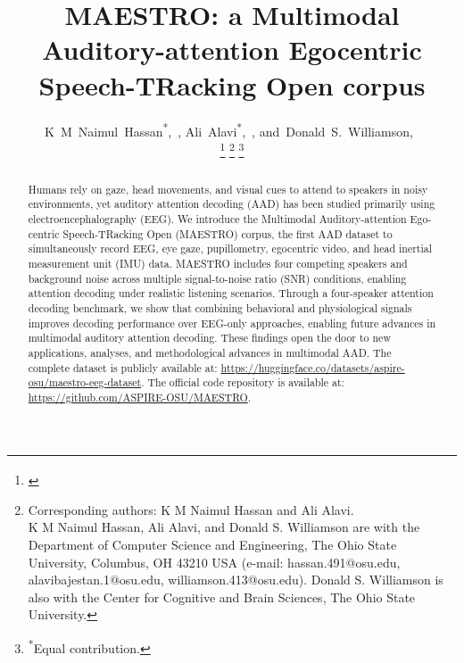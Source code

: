 \documentclass[journal]{IEEEtran}
\begin{document}
\title{MAESTRO: a Multimodal Auditory-attention Egocentric Speech-TRacking Open corpus}

\author{K~M~Naimul~Hassan\textsuperscript{*},~,
        Ali~Alavi\textsuperscript{*},~,
        and~Donald~S.~Williamson,~\\
\thanks{\textsuperscript{}}%
\thanks{Corresponding authors: K M Naimul Hassan and Ali Alavi. \\
K M Naimul Hassan, Ali Alavi, and Donald S. Williamson are with the Department of Computer Science and Engineering, The Ohio State University, Columbus, OH 43210 USA (e-mail: hassan.491@osu.edu, alavibajestan.1@osu.edu, williamson.413@osu.edu). Donald S. Williamson is also with the Center for Cognitive and Brain Sciences, The Ohio State University.}
\thanks{\textsuperscript{*}Equal contribution.}
}


\maketitle


\begin{abstract}

Humans rely on gaze, head movements, and visual cues to attend to speakers in noisy environments, yet auditory attention decoding (AAD) has been studied primarily using electroencephalography (EEG). We introduce the Multimodal Auditory-attention Ego-centric Speech-TRacking Open (MAESTRO) corpus, the first AAD dataset to simultaneously record EEG, eye gaze, pupillometry, egocentric video, and head inertial measurement unit (IMU) data. MAESTRO includes four competing speakers and background noise across multiple signal-to-noise ratio (SNR) conditions, enabling attention decoding under realistic listening scenarios. Through a four-speaker attention decoding benchmark, we show that combining behavioral and physiological signals improves decoding performance over EEG-only approaches, enabling future advances in multimodal auditory attention decoding. These findings open the door to new applications, analyses, and methodological advances in multimodal AAD. The complete dataset is publicly available at: \href{https://huggingface.co/datasets/aspire-osu/maestro-eeg-dataset}{https://huggingface.co/datasets/aspire-osu/maestro-eeg-dataset}. The official code repository is available at: \href{https://github.com/ASPIRE-OSU/MAESTRO}{https://github.com/ASPIRE-OSU/MAESTRO}. 
\end{abstract}
\end{document}
